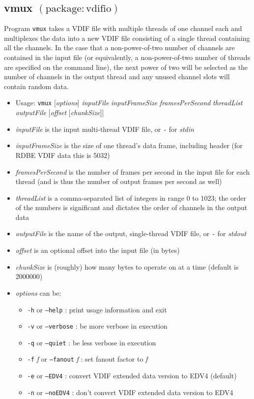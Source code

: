 
\subsection{vmux {\small $\mathrm{(package: vdifio)}$}} \label{sec:vmux}

Program {\tt vmux} takes a VDIF file with multiple threads of one channel each and multiplexes the data into a new VDIF file consisting of a single thread containing all the channels.
In the case that a non-power-of-two number of channels are contained in the input file (or equivalently, a non-power-of-two number of threads are specified on the command line), the next power of two will be selected as the number of channels in the output thread and any unused channel slots will contain random data.

\begin{itemize}
\item[] Usage: {\tt vmux} $[${\em options}$]$ {\em inputFile} {\em inputFrameSize} {\em framesPerSecond} {\em threadList} {\em outputFile} $[${\em offset} $[${\em chunkSize}$] ]$
\item[] {\em inputFile} is the input multi-thread VDIF file, or {\tt -} for {\em stdin}
\item[] {\em inputFrameSize} is the size of one thread's data frame, including header (for RDBE VDIF data this is 5032)
\item[] {\em framesPerSecond} is the number of frames per second in the input file for each thread (and is thus the number of output frames per second as well)
\item[] {\em threadList} is a comma-separated list of integers in range 0 to 1023; the order of the numbers is significant and dictates the order of channels in the output data
\item[] {\em outputFile} is the name of the output, single-thread VDIF file, or {\tt -} for {\em stdout}
\item[] {\em offset} is an optional offset into the input file (in bytes)
\item[] {\em chunkSize} is (roughly) how many bytes to operate on at a time (default is 2000000)
\item[] {\em options} can be:
\begin{itemize}
\item[] {\tt -h} or {\tt --help} : print usage information and exit
\item[] {\tt -v} or {\tt --verbose} : be more verbose in execution
\item[] {\tt -q} or {\tt --quiet} : be less verbose in execution
\item[] {\tt -f} {\em f} or {\tt --fanout} {\em f} : set fanout factor to {\em f}
\item[] {\tt -e} or {\tt --EDV4} : convert VDIF extended data version to EDV4 (default)
\item[] {\tt -n} or {\tt --noEDV4} : don't convert VDIF extended data version to EDV4
\end{itemize}
\end{itemize}

